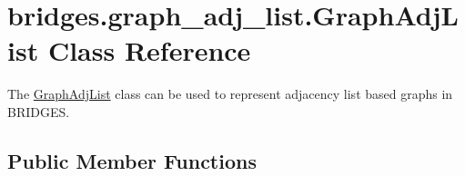 \hypertarget{classbridges_1_1graph__adj__list_1_1_graph_adj_list}{}\section{bridges.\+graph\+\_\+adj\+\_\+list.\+Graph\+Adj\+List Class Reference}
\label{classbridges_1_1graph__adj__list_1_1_graph_adj_list}


The \hyperlink{classbridges_1_1graph__adj__list_1_1_graph_adj_list}{Graph\+Adj\+List} class can be used to represent adjacency list based graphs in B\+R\+I\+D\+G\+E\+S.  


\subsection*{Public Member Functions}
